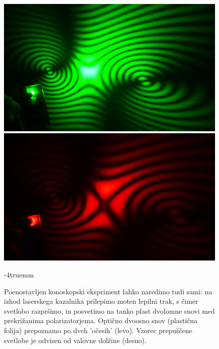 \begin{figure}[ht]
\centering
\includegraphics[width=7truecm]{slike/10_Konoskopija1.jpg}\hfill
\includegraphics[width=7truecm]{slike/10_Konoskopija2.jpg}
\caption{Poenostavljen konoskopski ekspriment lahko naredimo tudi sami: na izhod laserskega
kazalnika prilepimo moten lepilni trak, s čimer svetlobo razpršimo, in posvetimo na tanko plast
dvolomne snovi med prekrižanima polarizatorjema. Optično dvoosno snov (plastična folija)
prepoznamo po dveh 'očesih' (levo). Vzorec prepuščene svetlobe je odvisen od valovne dolžine (desno).}
\label{fig:10_konoskopija}
\vglue-4truemm
\end{figure}
